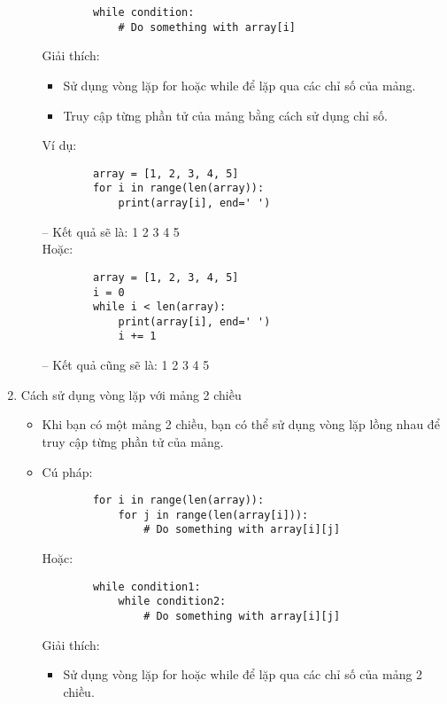 \begin{enumerate}[label=\alph*.]
\begin{itemize}
\begin{lstlisting}
        while condition:
            # Do something with array[i]
        \end{lstlisting}
        \vspace{-4.5em}
        Giải thích:
        \begin{itemize}
            \item Sử dụng vòng lặp for hoặc while để lặp qua các chỉ số của mảng.
            \item Truy cập từng phần tử của mảng bằng cách sử dụng chỉ số.
        \end{itemize}
        Ví dụ:
        \begin{lstlisting}
        array = [1, 2, 3, 4, 5]
        for i in range(len(array)):
            print(array[i], end=' ')
        \end{lstlisting}
        \vspace{-4.5em}
        -- Kết quả sẽ là: 1 2 3 4 5\\
        Hoặc:
        \begin{lstlisting}
        array = [1, 2, 3, 4, 5]
        i = 0
        while i < len(array):
            print(array[i], end=' ')  
            i += 1
        \end{lstlisting}
        \vspace{-4.5em}
        -- Kết quả cũng sẽ là: 1 2 3 4 5
    \end{itemize}
    \item Cách sử dụng vòng lặp với mảng 2 chiều
    \begin{itemize}
        \item Khi bạn có một mảng 2 chiều, bạn có thể sử dụng vòng lặp lồng nhau để truy cập từng phần tử của mảng.
        \item Cú pháp:
        \begin{lstlisting}
        for i in range(len(array)):
            for j in range(len(array[i])):
                # Do something with array[i][j]
        \end{lstlisting}
        \vspace{-4.5em}
        Hoặc:
        \begin{lstlisting}
        while condition1:
            while condition2:
                # Do something with array[i][j]
        \end{lstlisting}
        \vspace{-4.5em}
        Giải thích:
        \begin{itemize}
            \item Sử dụng vòng lặp for hoặc while để lặp qua các chỉ số của mảng 2 chiều.

\end{itemize}
\end{itemize}
\end{enumerate}
